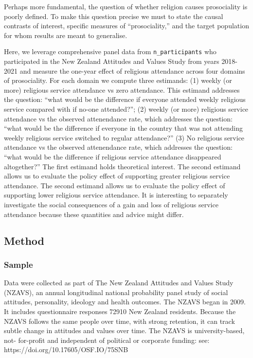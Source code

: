 \documentclass[
  singlecolumn]{article}
\begin{document}
Perhaps more fundamental, the question of whether religion causes
prosociality is poorly defined. To make this question precise we must to
state the causal contrasts of interest, specific measures of
``prosociality,'' and the target population for whom results are meant
to generalise.

Here, we leverage comprehensive panel data from \texttt{n\_participants}
who participated in the New Zealand Attitudes and Values Study from
years 2018-2021 and measure the one-year effect of religious attendance
across four domains of prosociality. For each domain we compute three
estimands: (1) weekly (or more) religious service attendance vs zero
attendance. This estimand addresses the question: ``what would be the
difference if everyone attended weekly religious service compared with
if no-one attended?''; (2) weekly (or more) religious service attendance
vs the observed attenendance rate, which addresses the question: ``what
would be the difference if everyone in the country that was not
attending weekly religious service switched to regular attendance?'' (3)
No religious service attendance vs the observed attenendance rate, which
addresses the question: ``what would be the difference if religious
service attendance disappeared altogether?'' The first estimand holds
theoretical interest. The second estimand allows us to evaluate the
policy effect of supporting greater religious service attendance. The
second estimand allows us to evaluate the policy effect of supporting
lower religious service attendance. It is interesting to separately
investigate the social consequences of a gain and loss of religious
service attendance because these quantities and advice might differ.

\subsection{Method}\label{method}

\subsubsection{Sample}\label{sample}

Data were collected as part of The New Zealand Attitudes and Values
Study (NZAVS), an annual longitudinal national probability panel study
of social attitudes, personality, ideology and health outcomes. The
NZAVS began in 2009. It includes questionnaire responses 72910 New
Zealand residents. Because the NZAVS follows the same people over time,
with strong retention, it can track subtle change in attitudes and
values over time. The NZAVS is university-based, not- for-profit and
independent of political or corporate funding: see:
https://doi.org/10.17605/OSF.IO/75SNB
\end{document}
